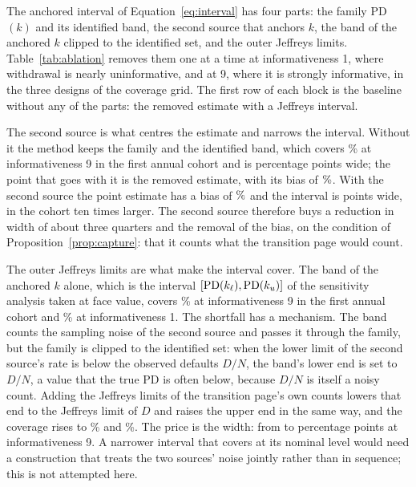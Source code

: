 The anchored interval of Equation~\eqref{eq:interval} has four parts: the family PD$(k)$ and its identified band, the second source that anchors $k$, the band of the anchored $k$ clipped to the identified set, and the outer Jeffreys limits. Table~\ref{tab:ablation} removes them one at a time at informativeness 1, where withdrawal is nearly uninformative, and at 9, where it is strongly informative, in the three designs of the coverage grid. The first row of each block is the baseline without any of the parts: the removed estimate with a Jeffreys interval.



The second source is what centres the estimate and narrows the interval. Without it the method keeps the family and the identified band, which covers \% at informativeness 9 in the first annual cohort and is  percentage points wide; the point that goes with it is the removed estimate, with its bias of $\nv{bias.fy.i9.industry}\%$. With the second source the point estimate has a bias of $\nv{bias.fy.i9.anchored}\%$ and the interval is  points wide,  in the cohort ten times larger. The second source therefore buys a reduction in width of about three quarters and the removal of the bias, on the condition of Proposition~\ref{prop:capture}: that it counts what the transition page would count.

The outer Jeffreys limits are what make the interval cover. The band of the anchored $k$ alone, which is the interval $[\mathrm{PD}(k_{\ell}),\mathrm{PD}(k_{u})]$ of the sensitivity analysis taken at face value, covers \% at informativeness 9 in the first annual cohort and \% at informativeness 1. The shortfall has a mechanism. The band counts the sampling noise of the second source and passes it through the family, but the family is clipped to the identified set: when the lower limit of the second source's rate is below the observed defaults $D/N$, the band's lower end is set to $D/N$, a value that the true PD is often below, because $D/N$ is itself a noisy count. Adding the Jeffreys limits of the transition page's own counts lowers that end to the Jeffreys limit of $D$ and raises the upper end in the same way, and the coverage rises to \% and \%. The price is the width: from  to  percentage points at informativeness 9. A narrower interval that covers at its nominal level would need a construction that treats the two sources' noise jointly rather than in sequence; this is not attempted here.

